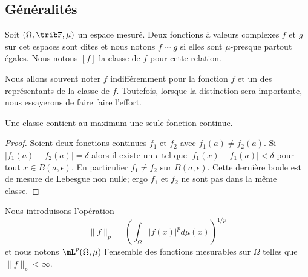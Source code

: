 \subsection{Généralités}

\begin{definition}      \label{DEFooKMJQooXeaUtp}
    Soit \( (\Omega,\tribF,\mu)\) un espace mesuré. Deux fonctions à valeurs complexes \( f\) et \( g\) sur cet espaces sont dites  et nous notons \( f\sim g\) si elles sont \( \mu\)-presque partout égales. Nous notons \( [f]\) la classe de \( f\) pour cette relation.
\end{definition}

Nous allons souvent noter \( f\) indifféremment pour la fonction \( f\) et un des représentants de la classe de \( f\). Toutefois, lorsque la distinction sera importante, nous essayerons de faire faire l'effort.

\begin{lemma}
    Une classe contient au maximum une seule fonction continue.
\end{lemma}

\begin{proof}
    Soient deux fonctions continues \( f_1\) et \( f_2\) avec \( f_1(a)\neq f_2(a)\). Si \( | f_1(a)-f_2(a) |=\delta\) alors il existe un \( \epsilon\) tel que \( | f_1(x)-f_1(a) |<\delta\) pour tout \( x\in B(a,\epsilon)\). En particulier \( f_1\neq f_2\) sur \( B(a,\epsilon)\). Cette dernière boule est de mesure de Lebesgue non nulle; ergo \( f_1\) et \( f_2\) ne sont pas dans la même classe.
\end{proof}

\begin{definition}      \label{DEFooTHIDooWYzBtn}
    Nous introduisons l'opération
    \begin{equation}
        \| f \|_p=\left( \int_{\Omega}| f(x) |^pd\mu(x) \right)^{1/p}
    \end{equation}
    et nous notons \( \mL^p(\Omega,\mu)\) l'ensemble des fonctions mesurables sur \( \Omega\) telles que \( \| f \|_p<\infty\).
\end{definition}

